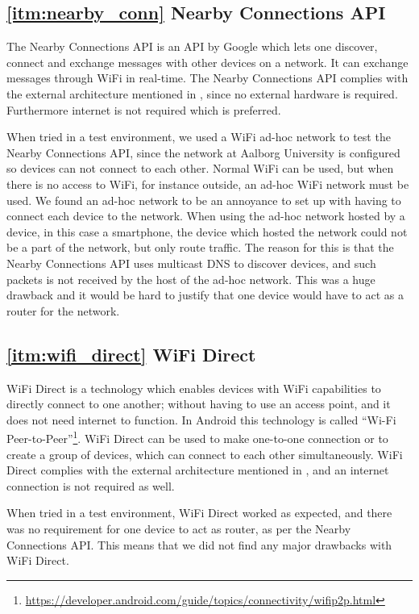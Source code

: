 \subsection*{\ref{itm:nearby_conn} Nearby Connections API}
The Nearby Connections API is an API by Google which lets one discover, connect and exchange messages with other devices on a network.
It can exchange messages through WiFi in real-time.\cite{nearby_connection}
The Nearby Connections API complies with the external architecture mentioned in ,
since no external hardware is required.
Furthermore internet is not required which is preferred.

When tried in a test environment, we used a WiFi ad-hoc network to test the Nearby Connections API,
since the network at Aalborg University is configured so devices can not connect to each other.
Normal WiFi can be used, but when there is no access to WiFi, for instance outside, an ad-hoc WiFi network must be used.
We found an ad-hoc network to be an annoyance to set up with having to connect each device to the network.
When using the ad-hoc network hosted by a device, in this case a smartphone,
the device which hosted the network could not be a part of the network, but only route traffic.
The reason for this is that the Nearby Connections API uses multicast DNS to discover devices,
and such packets is not received by the host of the ad-hoc network.
This was a huge drawback and it would be hard to justify that one device would have to act as a router for the network.

\subsection*{\ref{itm:wifi_direct} WiFi Direct}
WiFi Direct is a technology which enables devices with WiFi capabilities to directly connect to one another;
without having to use an access point, and it does not need internet to function.
In Android this technology is called ``Wi-Fi Peer-to-Peer''\footnote{\url{https://developer.android.com/guide/topics/connectivity/wifip2p.html}}.
WiFi Direct can be used to make one-to-one connection or to create a group of devices,
which can connect to each other simultaneously.\cite{wifi_direct}
WiFi Direct complies with the external architecture mentioned in , and an internet connection is not required as well.

When tried in a test environment, WiFi Direct worked as expected,
and there was no requirement for one device to act as router, as per the Nearby Connections API.
This means that we did not find any major drawbacks with WiFi Direct.

